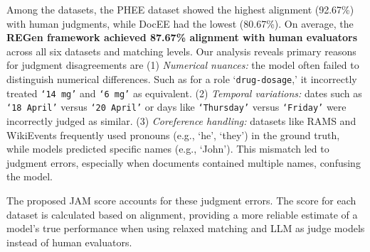 Among the datasets, the PHEE dataset showed the highest alignment (92.67\%) with human judgments, while DocEE had the lowest (80.67\%). On average, the \textbf{REGen framework achieved 87.67\% alignment with human evaluators} across all six datasets and matching levels. Our analysis reveals primary reasons for judgment disagreements are (1) \textit{Numerical nuances:} the model often failed to distinguish numerical differences. Such as for a role `\texttt{drug-dosage},' it incorrectly treated \texttt{`14 mg'} and \texttt{`6 mg'} as equivalent. (2) \textit{Temporal variations:} dates such as \texttt{`18 April'} versus \texttt{`20 April'} or days like \texttt{`Thursday'} versus \texttt{`Friday'} were incorrectly judged as similar. (3) \textit{Coreference handling:} datasets like RAMS and WikiEvents frequently used pronouns (e.g., `he', `they') in the ground truth, while models predicted specific names (e.g., `John'). This mismatch led to judgment errors, especially when documents contained multiple names, confusing the model.


The proposed JAM score accounts for these judgment errors. The score for each dataset is calculated based on alignment, providing a more reliable estimate of a model's true performance when using relaxed matching and LLM as judge models instead of human evaluators.






